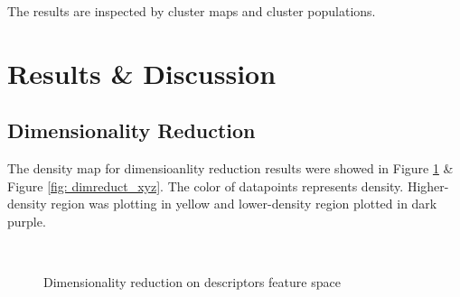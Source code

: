 \documentclass[a4paper]{article}
\begin{document}
The results are inspected by cluster maps and cluster populations. 

\section{Results \& Discussion}

\subsection{Dimensionality Reduction}
The density map for dimensioanlity reduction results were showed in Figure \ref{fig: dimreduct} \& Figure \ref{fig: dimreduct_xyz}. The color of datapoints represents density. Higher-density region was plotting in yellow and lower-density region plotted in dark purple.

\begin{figure}[H]
    \centering
     \\
    \caption{Dimensionality reduction on descriptors feature space}
    \label{fig: dimreduct}
\end{figure}
\end{document}
